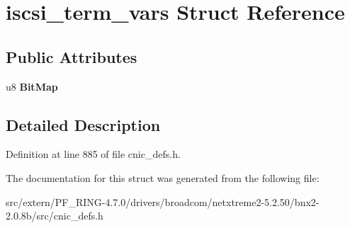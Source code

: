 \hypertarget{structiscsi__term__vars}{
\section{iscsi\_\-term\_\-vars Struct Reference}
\label{structiscsi__term__vars}
}
\subsection*{Public Attributes}
\begin{DoxyCompactItemize}
\item 
\hypertarget{structiscsi__term__vars_a79d3b7548fc2d3953980e546f60315e0}{
u8 {\bfseries BitMap}}
\label{structiscsi__term__vars_a79d3b7548fc2d3953980e546f60315e0}

\end{DoxyCompactItemize}


\subsection{Detailed Description}


Definition at line 885 of file cnic\_\-defs.h.



The documentation for this struct was generated from the following file:\begin{DoxyCompactItemize}
\item 
src/extern/PF\_\-RING-\/4.7.0/drivers/broadcom/netxtreme2-\/5.2.50/bnx2-\/2.0.8b/src/cnic\_\-defs.h\end{DoxyCompactItemize}
